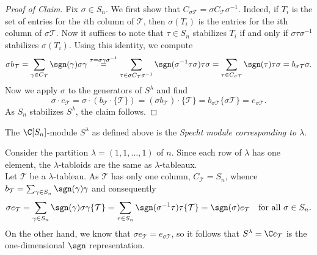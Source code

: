 \documentclass[../main.tex]{subfiles}
\begin{document}
\begin{proof}[Proof of Claim]
  Fix $ \sigma\in S_{n} $. We first show that $ C_{\sigma \mathcal{T}} = \sigma C_{\mathcal{T}} \sigma^{-1}$. Indeed, if $ T_{i} $ is the set of entries for the $ i $th column of $ \mathcal{T} $, then $ \sigma(T_{i}) $ is the entries for the $ i $th column of $ \sigma \mathcal{T} $. Now it suffices to note that $ \tau\in S_{n} $ stabilizes $ T_{i} $ if and only if $ \sigma \tau \sigma^{-1} $ stabilizes $ \sigma(T_{i}) $. Using this identity, we compute 
\begin{equation*}
  \sigma b_{\mathcal{T}} = \sum_{\gamma\in C_{\mathcal{T}}} \sgn(\gamma) \sigma \gamma \overset{\tau=\sigma \gamma \sigma^{-1}}{=} \sum_{\tau\in \sigma C_{\mathcal{T}} \sigma^{-1}} \sgn(\sigma^{-1} \tau \sigma) \tau \sigma = \sum_{\tau\in C_{\sigma\mathcal{T}}} \sgn(\tau)  \tau \sigma  = b_{\sigma \mathcal{T}} \sigma.
\end{equation*}
Now we apply $ \sigma $ to the generators of $ S^{\lambda} $ and find
\begin{equation*}
  \sigma \cdot e_{\mathcal{T}} = \sigma \cdot (b_{\mathcal{T}} \cdot\{\mathcal{T}\}) = (\sigma b_{\mathcal{T}}) \cdot \{\mathcal{T}\} = b_{\sigma \mathcal{T}} \{\sigma \mathcal{T}\} = e_{\sigma \mathcal{T}}.
\end{equation*}
As $ S_{n} $ stabilizes $ S^{\lambda} $, the claim follows. 
\end{proof}


\begin{definition}\label{def:spechtmodule}
  The $ \C[S_{n}] $-module $ S^{\lambda} $ as defined above is the \textit{Specht module corresponding to $ \lambda $}.
\end{definition}


\begin{example}
  Consider the partition $ \lambda=(1,1,\ldots, 1) $ of $ n $. Since each row of $ \lambda $ has one element, the $ \lambda $-tabloids are the same as $ \lambda $-tableaux.\\

  Let $ \mathcal{T} $ be a $ \lambda $-tableau. As $ \mathcal{T} $ has only one column, $ C_{\mathcal{T}} = S_{n} $, whence $ b_{\mathcal{T}} = \sum_{\gamma\in S_{n}} \sgn(\gamma) \gamma $ and consequently
  \[
    \sigma e_{\mathcal{T}} = \sum_{\gamma\in S_{n}} \sgn(\gamma) \sigma \gamma \{\mathcal{T}\} = \sum_{\tau\in S_{n}} \sgn(\sigma^{-1} \tau) \tau \{\mathcal{T}\} = \sgn(\sigma)e_{\mathcal{T}} \quad \text{for all } \sigma\in S_{n}.
  \]
  On the other hand, we know that $ \sigma e_{\mathcal{T}} = e_{\sigma \mathcal{T}} $, so it follows that $ S^{\lambda} = \C e_{\mathcal{T}} $ is the one-dimensional $ \sgn $ representation.
\end{example}
\end{document}
